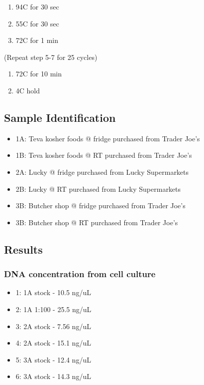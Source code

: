 \documentclass[]{article}
\providecommand{\tightlist}{%
  \setlength{\itemsep}{0pt}\setlength{\parskip}{0pt}}
\begin{document}
\begin{enumerate}
\def\labelenumi{\arabic{enumi}.}
\setcounter{enumi}{4}
\tightlist
\item
  94C for 30 sec
\item
  55C for 30 sec
\item
  72C for 1 min
\end{enumerate}

(Repeat step 5-7 for 25 cycles)

\begin{enumerate}
\def\labelenumi{\arabic{enumi}.}
\setcounter{enumi}{7}
\tightlist
\item
  72C for 10 min
\item
  4C hold
\end{enumerate}

\hypertarget{sample-identification}{%
\subsection{Sample Identification}\label{sample-identification}}

\begin{itemize}
\tightlist
\item
  1A: Teva kosher foods @ fridge purchased from Trader Joe's
\item
  1B: Teva kosher foods @ RT purchased from Trader Joe's
\item
  2A: Lucky @ fridge purchased from Lucky Supermarkets
\item
  2B: Lucky @ RT purchased from Lucky Supermarkets
\item
  3B: Butcher shop @ fridge purchased from Trader Joe's
\item
  3B: Butcher shop @ RT purchased from Trader Joe's
\end{itemize}

\hypertarget{results}{%
\subsection{Results}\label{results}}

\hypertarget{dna-concentration-from-cell-culture}{%
\subsubsection{DNA concentration from cell
culture}\label{dna-concentration-from-cell-culture}}

\begin{itemize}
\tightlist
\item
  1: 1A stock - 10.5 ng/uL
\item
  2: 1A 1:100 - 25.5 ng/uL
\item
  3: 2A stock - 7.56 ng/uL
\item
  4: 2A stock - 15.1 ng/uL
\item
  5: 3A stock - 12.4 ng/uL
\item
  6: 3A stock - 14.3 ng/uL
\end{itemize}
\end{document}
